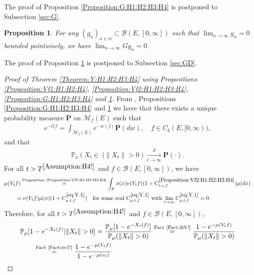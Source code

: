 \documentclass[12pt,a4paper]{amsart}
\numberwithin{equation}{section}
\theoremstyle{plain}
\newtheorem{prop}[thm]{Proposition}
\theoremstyle{definition}
\theoremstyle{remark}
\newcounter{N}
\newcounter{n}[N]
\begin{document}
The proof of Proposition \ref{Proposition:G:H1:H2:H3:H4} is postponed to Subsection \ref{sec:G}.

\begin{prop} \label{Proposition:GD:H1:H2:H3:H4} 
For any $(g_n)_{n\in \mathbb N} \subset \mathcal B(E,[0,\infty])$ such that $\lim_{n\to \infty} g_n = 0$ bounded pointwisely, we have $\lim_{n\to \infty} G g_n = 0$.
\end{prop}

The proof of Proposition \ref{Proposition:GD:H1:H2:H3:H4} is postponed to Subsection \ref{sec:GD}.

\begin{proof}[ Proof of Theorem \ref{Theorem:Y:H1:H2:H3:H4} using Propositions \ref{Proposition:Vf1:H1:H2:H4}, \ref{Proposition:Vf2:H1:H2:H3:H4}, \ref{Proposition:G:H1:H2:H3:H4} and \ref{Proposition:GD:H1:H2:H3:H4}]
From \cite[Proposition 1.19]{Li2011MeasureValued}, Propositions \ref{Proposition:G:H1:H2:H3:H4} and \ref{Proposition:GD:H1:H2:H3:H4}  we have that there exists a unique probability measure $\mathbf P$ on $\mathcal M_f(E)$ such that 
\begin{align}
 e^{-Gf} 
 = \int_{\mathcal M_f(E)} e^{- w(f)} \mathbf P(dw), 
 \quad f\in C_b (E, [0,\infty)),
\end{align}
and that
\begin{align}\label{eq:Y.0}
 \mathbb P_{\nu}(X_t \in \cdot | \|X_t\|>0 ) 
 \xrightarrow[t\to \infty]{d} \mathbf P(\cdot).
 \end{align}
For all $t>T^{\ref{Assumption:H4!}}$ and $f \in \mathcal B(E,[0,\infty])$, we have
\begin{align}
\MoveEqLeft \mu(V_tf) \overset{\text{Proposition \ref{Proposition:Vf2:H1:H2:H3:H4}}}= \int_E  \phi(x) \nu (V_tf) (1+C^{\ref{Proposition:Vf2:H1:H2:H3:H4}}_{t,x,f})\mu(dx)
\\ \label{eq:Y.1} & = \nu(V_tf) \mu(\phi)(1+ C^{\eqref{eq:Y.1}}_{\mu,t,f})\quad \text{for some real $C^{\eqref{eq:Y.1}}_{\mu,t,f}$ with $\lim_{t\to \infty} C^{\eqref{eq:Y.1}}_{\mu,t,f} = 0$}. 
\end{align}  
Therefore, for all $t > T^{\ref{Assumption:H4!}}$ and $f\in \mathcal B(E,[0,\infty])$,
\begin{align}
 \MoveEqLeft \mathbb P_\mu [1 - e^{-X_t(f)}|\|X_t\|>0] = \frac{\mathbb P_\mu [ 1 - e^{- X_t(f)}]} {\mathbb P_\mu (\|X_t\| > 0) } \overset{\text{Fact \ref{Fact:BV!}}}= \frac{1 - e^{- \mu(V_tf)}} { \mathbb P_\mu(\|X_t\| > 0)} 
 \\&\overset{\text{Fact \ref{Fact:sv1!}}}= \frac{1 - e^{- \mu(V_tf)}} {1 - e^{-\mu(v_t)}}

\end{align}
\end{proof}
\end{document}
